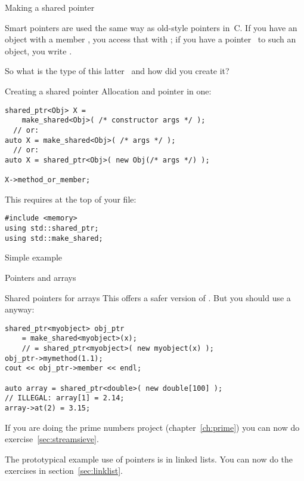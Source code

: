  {Making a shared pointer}
\label{sec:shared_ptr}

Smart pointers are used the same way as old-style pointers in~C.
If you have an
object  with a member , you access that with ; if you
have a pointer~ to such an object, you write .

So what is the type of this latter~ and how did you create it?

\begin{block}{Creating a shared pointer}
  \label{sl:make_shared}
  Allocation and pointer in one:
\begin{verbatim}
shared_ptr<Obj> X =
    make_shared<Obj>( /* constructor args */ );
  // or:
auto X = make_shared<Obj>( /* args */ );
  // or:
auto X = shared_ptr<Obj>( new Obj(/* args */) );

X->method_or_member;
\end{verbatim}
\end{block}

This requires at the top of your file:
\begin{verbatim}
#include <memory>
using std::shared_ptr;
using std::make_shared;
\end{verbatim}

\begin{block}{Simple example}
  \label{sl:shared-ptr}
\end{block}

 {Pointers and arrays}

\begin{slide}{Shared pointers for arrays}
This offers a safer version of . But you should use a
 anyway:
\begin{verbatim}
shared_ptr<myobject> obj_ptr
    = make_shared<myobject>(x);
    // = shared_ptr<myobject>( new myobject(x) );
obj_ptr->mymethod(1.1);
cout << obj_ptr->member << endl;

auto array = shared_ptr<double>( new double[100] );
// ILLEGAL: array[1] = 2.14;
array->at(2) = 3.15;
\end{verbatim}
\end{slide}

\begin{exercise}
  If you are doing the prime numbers project (chapter~\ref{ch:prime})
  you can now do exercise~\ref{sec:streamsieve}.
\end{exercise}

\begin{exercise}
  The prototypical example use of pointers is in linked lists. You can
  now do the exercises in section~\ref{sec:linklist}.
\end{exercise}

